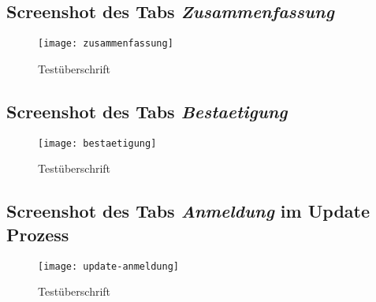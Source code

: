 \begin{landscape}
    \subsection{Screenshot des Tabs \textit{Zusammenfassung}}
    \label{section-zusammenfassung}
    \begin{figure}[H]
        \centering
        \caption{Testüberschrift}
        \begin{adjustbox}{width=\linewidth, center}
            \texttt{[image: zusammenfassung]}
        \end{adjustbox}
    \end{figure}

    \subsection{Screenshot des Tabs \textit{Bestaetigung}}
    \label{section-bestaetigung}
    \begin{figure}[H]
        \centering
        \caption{Testüberschrift}
        \begin{adjustbox}{width=\linewidth, center}
            \texttt{[image: bestaetigung]}
        \end{adjustbox}
    \end{figure}

    \subsection{Screenshot des Tabs \textit{Anmeldung} im Update Prozess}
    \label{section-update-anmeldung}
    \begin{figure}[H]
        \centering
        \caption{Testüberschrift}
        \begin{adjustbox}{width=\linewidth, center}
            \texttt{[image: update-anmeldung]}
        \end{adjustbox}
    \end{figure}

\end{landscape}
